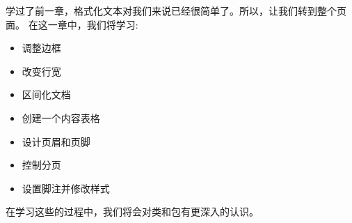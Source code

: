 学过了前一章，格式化文本对我们来说已经很简单了。所以，让我们转到整个页面。
在这一章中，我们将学习:
\begin{itemize}
	\item{调整边框}
	\item{改变行宽}
	\item{区间化文档}
	\item{创建一个内容表格}
	\item{设计页眉和页脚}
	\item{控制分页}
	\item{设置脚注并修改样式}
\end{itemize}
在学习这些的过程中，我们将会对类和包有更深入的认识。

